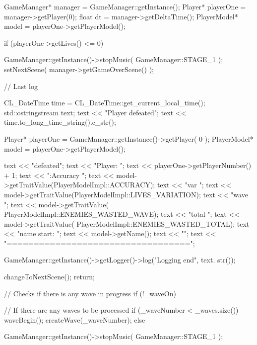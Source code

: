\begin{DoxyCode}
{
        GameManager* manager = GameManager::getInstance();
        Player* playerOne = manager->getPlayer(0);
        float dt = manager->getDeltaTime();
        PlayerModel* model = playerOne->getPlayerModel();

        if (playerOne->getLives() <= 0)
        {
                GameManager::getInstance()->stopMusic( GameManager::STAGE_1 );
                setNextScene( manager->getGameOverScene() );

                // Last log

                CL_DateTime time = CL_DateTime::get_current_local_time();
                std::ostringstream text;
                text << "Player defeated\n";
                text << time.to_long_time_string().c_str();

                Player* playerOne = GameManager::getInstance()->getPlayer( 0 );
                PlayerModel* model = playerOne->getPlayerModel();

                text << "\nPlayer defeated\n\n ";
                text << "Player: ";
                text << playerOne->getPlayerNumber() + 1;
                text << "\nStats:\n Accuracy ";
                text << model->getTraitValue(PlayerModelImpl::ACCURACY);
                text << "\tLives var ";
                text << model->getTraitValue(PlayerModelImpl::LIVES_VARIATION);
                text << "\tEnemies wave ";
                text << model->getTraitValue(
      PlayerModelImpl::ENEMIES_WASTED_WAVE);
                text << "\tEnemies total ";
                text << model->getTraitValue(
      PlayerModelImpl::ENEMIES_WASTED_TOTAL);
                text << "\nModel name start: ";
                text << model->getName();
                text << "\n";
                text << "==================================\n";

                GameManager::getInstance()->getLogger()->log("Logging end", text.
      str());

                changeToNextScene();
                return;
        }

        // Checks if there is any wave in progress
        if (!_waveOn)
        {
                // If there are any waves to be processed
                if (_waveNumber < _waves.size())
                {
                        waveBegin();
                        createWave(_waveNumber);
                }
                else
                {
                        GameManager::getInstance()->stopMusic( 
      GameManager::STAGE_1 );

}}}
\end{DoxyCode}
